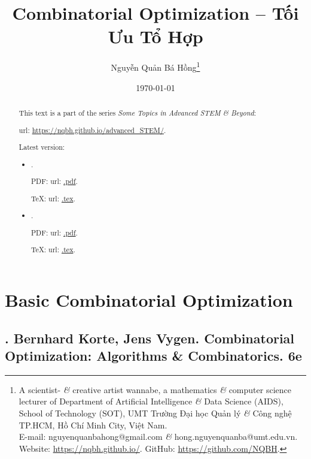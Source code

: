 \documentclass{article}
\title{Combinatorial Optimization -- Tối Ưu Tổ Hợp}
\author{Nguyễn Quản Bá Hồng\footnote{A scientist- {\it\&} creative artist wannabe, a mathematics {\it\&} computer science lecturer of Department of Artificial Intelligence {\it\&} Data Science (AIDS), School of Technology (SOT), UMT Trường Đại học Quản lý {\it\&} Công nghệ TP.HCM, Hồ Chí Minh City, Việt Nam.\\E-mail: {\sf nguyenquanbahong@gmail.com} {\it\&} {\sf hong.nguyenquanba@umt.edu.vn}. Website: \url{https://nqbh.github.io/}. GitHub: \url{https://github.com/NQBH}.}}
\date{\today}
\begin{document}
\maketitle
\begin{abstract}
    This text is a part of the series {\it Some Topics in Advanced STEM \& Beyond}:

    {\sc url}: \url{https://nqbh.github.io/advanced_STEM/}.

    Latest version:
    \begin{itemize}
        \item {\it }.

        PDF: {\sc url}: \url{.pdf}.

        \TeX: {\sc url}: \url{.tex}.
        \item {\it }.

        PDF: {\sc url}: \url{.pdf}.

        \TeX: {\sc url}: \url{.tex}.
    \end{itemize}
\end{abstract}
\tableofcontents


\section{Basic Combinatorial Optimization}


\subsection{\cite{Korte_Vygen2018}. {\sc Bernhard Korte, Jens Vygen}. Combinatorial Optimization: Algorithms \& Combinatorics. 6e}
\end{document}
